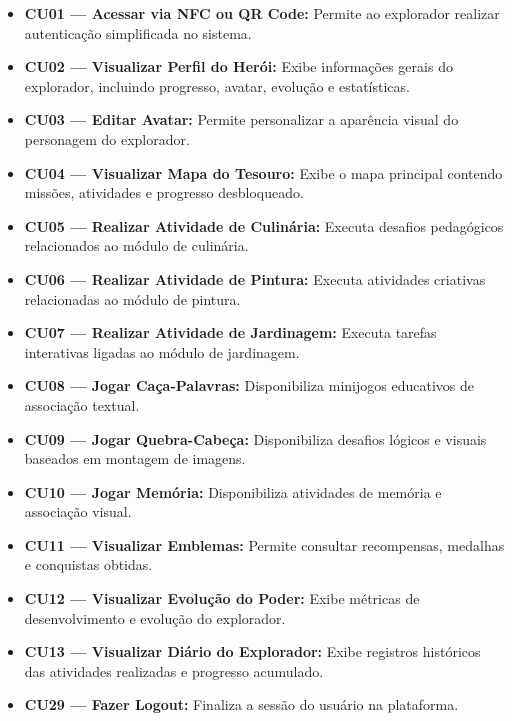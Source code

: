 \documentclass[12pt, a4paper]{article}
\begin{document}
\begin{itemize}
    \item \textbf{CU01 --- Acessar via NFC ou QR Code:} Permite ao explorador realizar autenticação simplificada no sistema.
 
    \item \textbf{CU02 --- Visualizar Perfil do Herói:} Exibe informações gerais do explorador, incluindo progresso, avatar, evolução e estatísticas.
 
    \item \textbf{CU03 --- Editar Avatar:} Permite personalizar a aparência visual do personagem do explorador.
 
    \item \textbf{CU04 --- Visualizar Mapa do Tesouro:} Exibe o mapa principal contendo missões, atividades e progresso desbloqueado.
 
    \item \textbf{CU05 --- Realizar Atividade de Culinária:} Executa desafios pedagógicos relacionados ao módulo de culinária.
 
    \item \textbf{CU06 --- Realizar Atividade de Pintura:} Executa atividades criativas relacionadas ao módulo de pintura.
 
    \item \textbf{CU07 --- Realizar Atividade de Jardinagem:} Executa tarefas interativas ligadas ao módulo de jardinagem.
 
    \item \textbf{CU08 --- Jogar Caça-Palavras:} Disponibiliza minijogos educativos de associação textual.
 
    \item \textbf{CU09 --- Jogar Quebra-Cabeça:} Disponibiliza desafios lógicos e visuais baseados em montagem de imagens.
 
    \item \textbf{CU10 --- Jogar Memória:} Disponibiliza atividades de memória e associação visual.
 
    \item \textbf{CU11 --- Visualizar Emblemas:} Permite consultar recompensas, medalhas e conquistas obtidas.
 
    \item \textbf{CU12 --- Visualizar Evolução do Poder:} Exibe métricas de desenvolvimento e evolução do explorador.
 
    \item \textbf{CU13 --- Visualizar Diário do Explorador:} Exibe registros históricos das atividades realizadas e progresso acumulado.
 
    \item \textbf{CU29 --- Fazer Logout:} Finaliza a sessão do usuário na plataforma.
\end{itemize}
\end{document}
